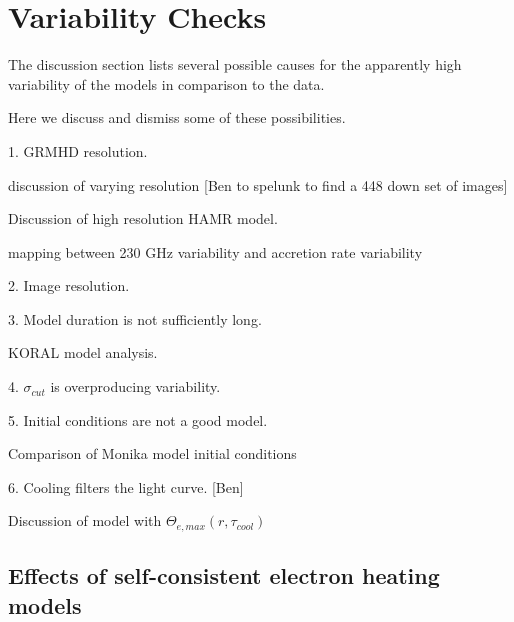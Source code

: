 \section{Variability Checks}\label{app:variability}


The discussion section lists several possible causes for the apparently high variability of the models in comparison to the data.

Here we discuss and dismiss some of these possibilities.

1. GRMHD resolution.

discussion of varying resolution [Ben to spelunk to find a 448 down set of images]

Discussion of high resolution HAMR model.

mapping between 230 GHz variability and accretion rate variability

2. Image resolution.

3. Model duration is not sufficiently long.

KORAL model analysis.

4. $\sigma_{cut}$ is overproducing variability.

5. Initial conditions are not a good model.

Comparison of Monika model initial conditions

6. Cooling filters the light curve. [Ben]

Discussion of model with $\Theta_{e,max}(r, \tau_{cool})$




\subsection{Effects of self-consistent electron heating models}

